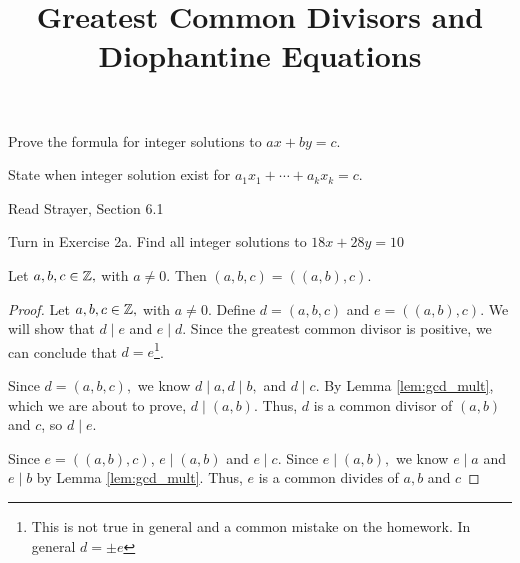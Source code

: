 \documentclass{../ximera}
\title{Greatest Common Divisors and Diophantine Equations}
\begin{document}
\begin{abstract}
\end{abstract}
\maketitle


\begin{obj}
	\item Prove the formula for integer solutions to $ax+by=c$.
	\item State when integer solution exist for $a_1x_1+\cdots+a_kx_k=c$.
\end{obj}


\begin{instructorNotes}
	\begin{pre}
		\item[Read] Strayer, Section 6.1
		\item[Turn in] Exercise 2a.
		Find all integer solutions to $18x+28y=10$
	   \end{pre}
\end{instructorNotes}


\begin{lemma}\label{lem:gcd_3case}
	Let $a,b,c\in\mathbb Z,$ with $a\neq 0$. Then $(a,b,c)=((a,b),c).$

 	\begin{proof}
 		Let $a,b,c\in\mathbb Z,$ with $a\neq 0$. Define $d=(a,b,c)$ and $e=((a,b),c).$ We will show that $d\mid e$ and $e\mid d$. Since the greatest common divisor is positive, we can conclude that $d=e$\footnote{This is not true in general and a common mistake on the homework. In general $d=\pm e$}.

 		Since $d=(a,b,c),$ we know $d\mid a, d\mid b,$ and $d\mid c$. By Lemma \ref{lem:gcd_mult}, which we are about to prove, $d\mid (a,b)$. Thus, $d$ is a common divisor of $(a,b)$ and $c$, so $d\mid e$.

 		Since $e=((a,b),c)$, $e\mid  (a,b)$ and $e\mid c$. Since $e\mid (a,b),$ we know $e\mid a$ and $e\mid b$ by Lemma \ref{lem:gcd_mult}. Thus, $e$ is a common divides of $a,b$ and $c$
 	\end{proof}
\end{lemma}
\end{document}
